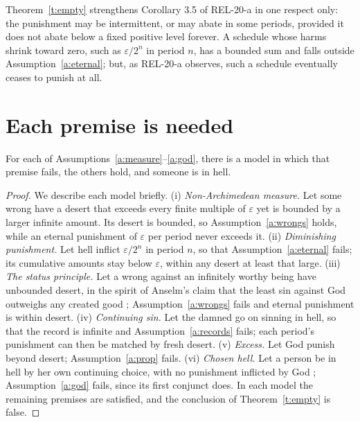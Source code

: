 \documentclass{situationist-preprint}
\begin{document}
Theorem~\ref{t:empty} strengthens Corollary 3.5 of REL-20-a in one respect only: the punishment may be intermittent, or may abate in some periods, provided it does not abate below a fixed positive level forever. A schedule whose harms shrink toward zero, such as $\varepsilon/2^{n}$ in period $n$, has a bounded sum and falls outside Assumption~\ref{a:eternal}; but, as REL-20-a observes, such a schedule eventually ceases to punish at all.

\section{Each premise is needed}

\begin{proposition}\label{p:indep}
For each of Assumptions~\ref{a:measure}--\ref{a:god}, there is a model in which that premise fails, the others hold, and someone is in hell.
\end{proposition}

\begin{proof}
We describe each model briefly.
(i) \emph{Non-Archimedean measure.} Let some wrong have a desert that exceeds every finite multiple of $\varepsilon$ yet is bounded by a larger infinite amount. Its desert is bounded, so Assumption~\ref{a:wrongs} holds, while an eternal punishment of $\varepsilon$ per period never exceeds it.
(ii) \emph{Diminishing punishment.} Let hell inflict $\varepsilon/2^{n}$ in period $n$, so that Assumption~\ref{a:eternal} fails; its cumulative amounts stay below $\varepsilon$, within any desert at least that large.
(iii) \emph{The status principle.} Let a wrong against an infinitely worthy being have unbounded desert, in the spirit of Anselm's claim that the least sin against God outweighs any created good \citep[I.21]{Anselm1098}; Assumption~\ref{a:wrongs} fails and eternal punishment is within desert.
(iv) \emph{Continuing sin.} Let the damned go on sinning in hell, so that the record is infinite and Assumption~\ref{a:records} fails; each period's punishment can then be matched by fresh desert.
(v) \emph{Excess.} Let God punish beyond desert; Assumption~\ref{a:prop} fails.
(vi) \emph{Chosen hell.} Let a person be in hell by her own continuing choice, with no punishment inflicted by God \citep{Lewis1946, Kvanvig1993}; Assumption~\ref{a:god} fails, since its first conjunct does.
In each model the remaining premises are satisfied, and the conclusion of Theorem~\ref{t:empty} is false.
\end{proof}
\end{document}
